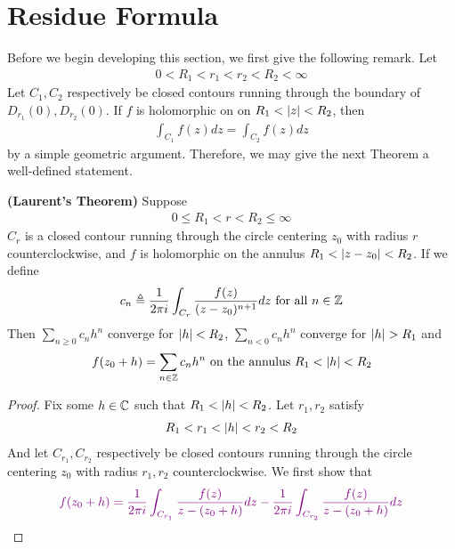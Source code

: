 \documentclass{report}
\begin{document}
\section{Residue Formula}
\begin{abstract}

\end{abstract}
\begin{mdframed}
Before we begin developing this section, we first give the following remark. Let  
\begin{align*}
0<R_1 <r_1<r_2<R_2 < \infty
\end{align*}
Let $C_1,C_2$ respectively be closed contours running through the boundary of $D_{r_1}(0),D_{r_2}(0)$. If $f$ is holomorphic on on $R_1 < \left|z\right|<R_2$, then 
\begin{align*}
\int_{C_1} f(z)dz= \int_{C_2}f(z)dz
\end{align*}
by a simple geometric argument. Therefore, we may give the next Theorem a well-defined statement. 
\end{mdframed}
\begin{theorem}
\label{LTC}
\textbf{(Laurent's Theorem)} Suppose
\begin{align*}
0\leq R_1 <r< R_2 \leq \infty
\end{align*}
$C_r$ is a closed contour running through the circle centering $z_0$ with radius $r$ counterclockwise, and $f$ is holomorphic on the annulus $R_1 < \left|z-z_0\right| < R_2$. If we define 
\begin{align*}
c_n\triangleq  \frac{1}{2\pi  i} \int_{C_r} \frac{f(z)}{(z-z_0)^{n+1}}dz\text{ for all }n\in\mathbb{Z}
\end{align*}
Then $\sum_{n\geq 0} c_nh^n$ converge for $\left|h\right|<R_2$, $\sum_{n<0} c_nh^{n}$ converge for $\abso{h}>R_1$ and 
\begin{align*}
f(z_0+h)= \sum_{n\in\mathbb{Z}} c_nh^n\text{ on the annulus }R_1 < \left|h\right|< R_2
\end{align*}
\end{theorem}
\begin{proof}
Fix some  $h\in\mathbb{C}$ such that $R_1 < \left|h\right|<R_2$. Let $r_1,r_2$ satisfy 
 \begin{align*}
R_1 < r_1 < \left|h\right|< r_2 < R_2
\end{align*}
And let $C_{r_1},C_{r_2}$ respectively be closed contours running through the circle centering $z_0$ with radius  $r_1,r_2$ counterclockwise. We first show that 
\begin{align*}
  \textcolor{violet}{f(z_0+h)= \frac{1}{2\pi  i}\int_{C_{r_1}} \frac{f(z)}{z-(z_0+h)}dz- \frac{1}{2\pi i}\int _{C_{r_2}} \frac{f(z)}{z-(z_0+h)}dz}
\end{align*}
\end{proof}
\end{document}
